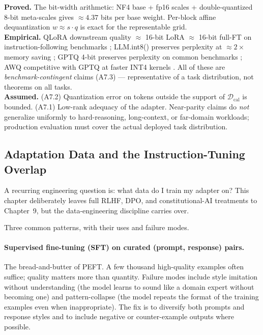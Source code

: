 \begin{provedassumed}
\textbf{Proved.} The bit-width arithmetic: NF4 base + fp16 scales +
double-quantized 8-bit meta-scales gives $\approx 4.37$ bits per base
weight. Per-block affine dequantization $w \approx s \cdot q$ is exact
for the representable grid.\\
\textbf{Empirical.} QLoRA downstream quality $\approx$ 16-bit LoRA
$\approx$ 16-bit full-FT on instruction-following benchmarks
\citep{dettmers2023qlora}; LLM.int8() preserves perplexity
at $\approx 2\times$ memory saving
\citep{dettmers2022llmint8}; GPTQ 4-bit preserves perplexity on
common benchmarks \citep{frantar2023gptq}; AWQ competitive with
GPTQ at faster INT4 kernels \citep{lin2024awq}. All of these are
\emph{benchmark-contingent} claims (A7.3) --- representative of a
task distribution, not theorems on all tasks.\\
\textbf{Assumed.} (A7.2) Quantization error on tokens outside the
support of $\mathcal{D}_{\mathrm{cal}}$ is bounded. (A7.1) Low-rank
adequacy of the adapter. Near-parity claims do \emph{not} generalize
uniformly to hard-reasoning, long-context, or far-domain workloads;
production evaluation must cover the actual deployed task
distribution.
\end{provedassumed}

\subsection{Adaptation Data and the Instruction-Tuning Overlap}

A recurring engineering question is: what data do I train my adapter
on? This chapter deliberately leaves full RLHF, DPO, and
constitutional-AI treatments to Chapter~9, but the data-engineering
discipline carries over.

Three common patterns, with their uses and failure modes.

\paragraph{Supervised fine-tuning (SFT) on curated (prompt, response)
pairs.} The bread-and-butter of PEFT. A few thousand high-quality
examples often suffice; quality matters more than quantity. Failure
modes include style imitation without understanding (the model
learns to sound like a domain expert without becoming one) and
pattern-collapse (the model repeats the format of the training
examples even when inappropriate). The fix is to diversify both
prompts and response styles and to include negative or
counter-example outputs where possible.

